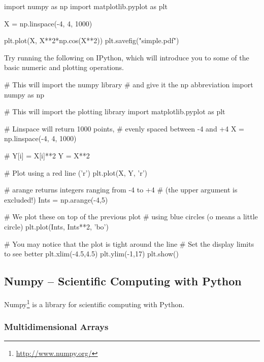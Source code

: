 \begin{python}
import numpy as np
import matplotlib.pyplot as plt

X = np.linspace(-4, 4, 1000)

plt.plot(X, X**2*np.cos(X**2))
plt.savefig("simple.pdf")
\end{python}


\begin{exercise}
Try running the following on IPython, which will introduce you to some of the basic numeric and plotting operations.

\begin{python}
# This will import the numpy library
# and give it the np abbreviation
import numpy as np

# This will import the plotting library
import matplotlib.pyplot as plt

# Linspace will return 1000 points,
# evenly spaced between -4 and +4
X = np.linspace(-4, 4, 1000)

# Y[i] = X[i]**2
Y = X**2

# Plot using a red line ('r')
plt.plot(X, Y, 'r')

# arange returns integers ranging from -4 to +4
# (the upper argument is excluded!)
Ints = np.arange(-4,5)

# We plot these on top of the previous plot
# using blue circles (o means a little circle)
plt.plot(Ints, Ints**2, 'bo')

# You may notice that the plot is tight around the line
# Set the display limits to see better
plt.xlim(-4.5,4.5)
plt.ylim(-1,17)
plt.show()
\end{python}
\end{exercise}


\subsection{Numpy -- Scientific Computing with Python}

Numpy\footnote{\url{http://www.numpy.org/}} is a library for scientific computing with Python.

\subsubsection{Multidimensional Arrays}

